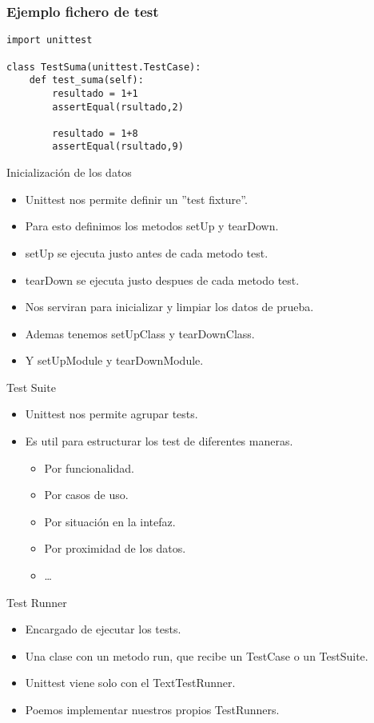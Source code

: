 \documentclass[10pt]{beamer}
\begin{document}
  \begin{frame}[containsverbatim]
    \frametitle{Ejemplo fichero de test}
    \begin{verbatim}
import unittest

class TestSuma(unittest.TestCase):
    def test_suma(self):
        resultado = 1+1
        assertEqual(rsultado,2)
    
        resultado = 1+8
        assertEqual(rsultado,9)
        \end{verbatim}
  \end{frame}


  \begin{frame}{Inicialización de los datos}
    \begin{itemize}
      \item Unittest nos permite definir un ''test fixture''.
      \item Para esto definimos los metodos setUp y tearDown.
      \item setUp se ejecuta justo antes de cada metodo test.
      \item tearDown se ejecuta justo despues de cada metodo test.
      \item Nos serviran para inicializar y limpiar los datos de prueba.
      \item Ademas tenemos setUpClass y tearDownClass.
      \item Y setUpModule y tearDownModule.
    \end{itemize}
  \end{frame}

  \begin{frame}{Test Suite}
    \begin{itemize}
      \item Unittest nos permite agrupar tests.
      \item Es util para estructurar los test de diferentes maneras.
      \begin{itemize}
        \item Por funcionalidad.
        \item Por casos de uso.
        \item Por situación en la intefaz.
        \item Por proximidad de los datos.
        \item \dots
      \end{itemize}
    \end{itemize}
  \end{frame}

  \begin{frame}{Test Runner}
    \begin{itemize}
      \item Encargado de ejecutar los tests.
      \item Una clase con un metodo run, que recibe un TestCase o un TestSuite.
      \item Unittest viene solo con el TextTestRunner.
      \item Poemos implementar nuestros propios TestRunners.
    \end{itemize}
  \end{frame}
\end{document}
